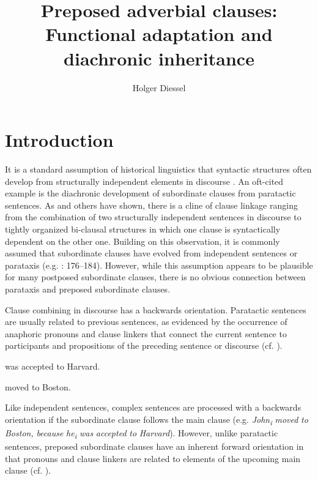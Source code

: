 \documentclass[output=paper]{langsci/langscibook}
\author{Holger Diessel\affiliation{University of Jena}}
\title{Preposed adverbial clauses: Functional adaptation and diachronic inheritance}
\begin{document}
\maketitle 

\section{Introduction}

It is a standard assumption of historical linguistics that syntactic structures often develop from structurally independent elements in discourse \citep{Givón1979}. An oft-cited example is the diachronic development of subordinate clauses from paratactic sentences. As \citet{Lehmann1988} and others have shown, there is a cline of clause linkage ranging from the combination of two structurally independent sentences in discourse to tightly organized bi-clausal structures in which one clause is syntactically dependent on the other one. Building on this observation, it is commonly assumed that subordinate clauses have evolved from independent sentences or parataxis (e.g. \citealt{HopperTraugott2003}: 176--184). However, while this assumption appears to be plausible for many postposed subordinate clauses, there is no obvious connection between parataxis and preposed subordinate clauses.

Clause combining in discourse has a backwards orientation. Paratactic sentences are usually related to previous sentences, as evidenced by the occurrence of anaphoric pronouns and clause linkers that connect the current sentence to participants and propositions of the preceding sentence or discourse (cf. ).
 

\ea%
\label{ex:diessel:1}
 was accepted to Harvard.  \textit{} moved to Boston.
\z


Like independent sentences, complex sentences are processed with a backwards orientation if the subordinate clause follows the main clause (e.g. \textit{John\textsubscript{i}} \textit{moved} \textit{to} \textit{Boston,} \textit{because} \textit{he\textsubscript{i}} \textit{was} \textit{accepted} \textit{to} \textit{Harvard}). However, unlike paratactic sentences, preposed subordinate clauses have an inherent forward orientation in that pronouns and clause linkers are related to elements of the upcoming main clause (cf. ).
\end{document}
